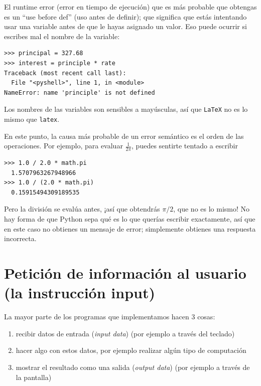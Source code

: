   
 

El runtime error (error en tiempo de ejecución) que es más probable que
obtengas es un ``use before def'' (uso antes de definir); que significa
que estás intentando usar una variable antes de que le hayas asignado un
valor. Eso puede ocurrir si escribes mal el nombre de la variable:

\begin{Verbatim}[frame=single]
>>> principal = 327.68
>>> interest = principle * rate
Traceback (most recent call last):
  File "<pyshell>", line 1, in <module>
NameError: name 'principle' is not defined
\end{Verbatim}

Los nombres de las variables son sensibles a mayúsculas, así que
\texttt{LaTeX} no es lo mismo que \texttt{latex}.

 

En este punto, la causa más probable de un error semántico es el orden
de las operaciones. Por ejemplo, para evaluar \(\frac{1}{2 \pi}\),
puedes sentirte tentado a escribir

\begin{Verbatim}[frame=single]
>>> 1.0 / 2.0 * math.pi
  1.5707963267948966
>>> 1.0 / (2.0 * math.pi)
  0.15915494309189535
\end{Verbatim}

Pero la división se evalúa antes, ¡así que obtendrás \(\pi / 2\), que no
es lo mismo! No hay forma de que Python sepa qué es lo que querías
escribir exactamente, así que en este caso no obtienes un mensaje de
error; simplemente obtienes una respuesta incorrecta.


\section{Petición de información al usuario (la instrucción input)}

La mayor parte de los programas que implementamos hacen 3 cosas:
\begin{enumerate}[nosep]
\item recibir datos de entrada ({\em input data}) (por ejemplo a través del teclado)
\item hacer algo con estos datos, por ejemplo realizar algún 
tipo de computación
\item mostrar el resultado como una salida ({\em output data}) (por ejemplo a través de la pantalla)
\end{enumerate}

